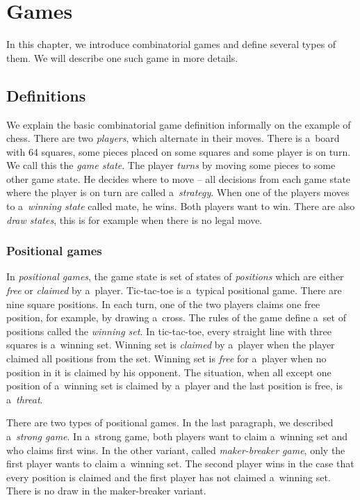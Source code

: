 \chapter{Games}

In this chapter, we introduce combinatorial games and define several types of
them. We will describe one such game in more details. 

\section{Definitions}

We explain the basic combinatorial game definition informally on the example of
chess. There are two \emph{players}, which alternate in their moves. There is
a~board with 64 squares, some pieces placed on some squares and some player is
on turn. We call this the \emph{game state}. The player \emph{turns} by moving
some pieces to some other game state. He decides where to move -- all decisions
from each game state where the player is on turn are called a~\emph{strategy}.
When one of the players moves to a~\emph{winning state} called mate, he wins.
Both players want to win. There are also \emph{draw states}, this is for
example when there is no legal move. 

\subsection{Positional games}

In \emph{positional games}, the game state is set of states of
\emph{positions} which are either \emph{free} or \emph{claimed} by a~player.
Tic-tac-toe is a~typical positional game. There are nine square positions. In
each turn, one of the two players claims one free position, for example, by drawing 
a~cross. The rules of the game define a~set of positions called the \emph{winning
set}. In tic-tac-toe, every straight line with three squares is a~winning set.
Winning set is \emph{claimed} by a~player when the player claimed all positions
from the set. Winning set is \emph{free} for a~player when no position in it is
claimed by his opponent. The situation, when all except one position of
a~winning set is claimed by a~player and the last position is free, is
a~\emph{threat}.

There are two types of positional games. In the last paragraph, we described 
a~\emph{strong game}. In a~strong game, both players want to claim a~winning set
and who claims first wins. In the other variant, called \emph{maker-breaker
game}, only the first player wants to claim a~winning set. The second player wins in the
case that every position is claimed and the first player has not claimed a~winning
set. There is no draw in the maker-breaker variant.

